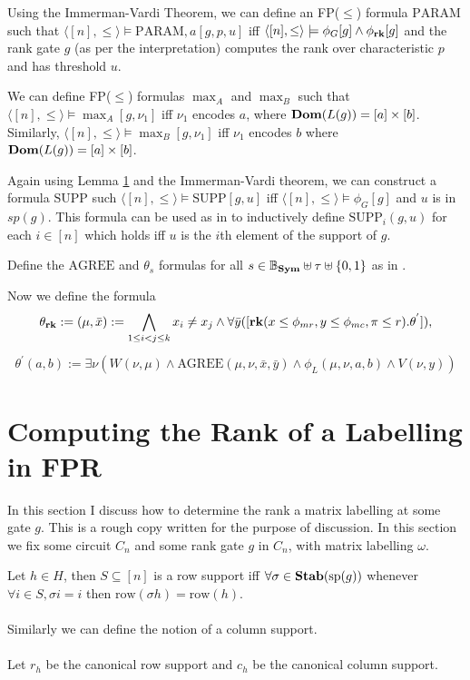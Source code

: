 \documentclass[12pt]{report}
\newcommand{\SB}{\mathbb{B}_{\sym}} %
\newcommand{\stab}{\text{\textbf{Stab}}}
\newcommand{\sym}{\text{\textbf{Sym}}}
\newcommand{\rank}{\text{\textbf{rk}}}
\newcommand{\dom}{\text{\textbf{Dom}}}
\newcommand{\agree}{\text{AGREE}}
\newcommand{\supp}{\text{SUPP}}
\newcommand{\rankparam}{\text{PARAM}}
\newcommand{\consp}{\text{sp}}
\newcommand{\row}{\text{row}}
\begin{document}
Using the Immerman-Vardi Theorem, we can define an FP($\leq$) formula
$\rankparam$ such that $\langle [n], \leq\rangle \models \rankparam,a[g,p,u]$ iff
$\langle [n], \leq\rangle \models \phi_G[g] \land \phi_{\rank}[g]$ and the rank
gate $g$ (as per the interpretation) computes the rank over characteristic $p$
and has threshold $u$.

We can define FP($\leq$) formulas $\max_A$ and $\max_B$ such that $\langle [n],
\leq \rangle \models \max_A[g, \nu_1]$ iff $\nu_1$ encodes $a$, where
$\dom(L(g)) = [a]\times [b]$. Similarly, $\langle [n], \leq \rangle \models
\max_B[g, \nu_1]$ iff $\nu_1$ encodes $b$ where $\dom(L(g)) = [a] \times [b]$.

Again using Lemma \ref{} and the Immerman-Vardi theorem, we can construct a
formula $\supp$ such $\langle [n], \leq \rangle \models \supp[g,u]$ iff $\langle
[n], \leq \rangle \models \phi_G[g]$ and $u$ is in $sp(g)$. This formula can be
used as in \cite{} to inductively define $\supp_i(g,u)$ for each $i \in [n]$
which holds iff $u$ is the $i$th element of the support of $g$.

Define the $\agree$ and $\theta_s$ formulas for all $s \in \SB \uplus \tau
\uplus \{0,1\}$ as in \cite{}.

Now we define the formula
\begin{align*}
  \theta_{\rank}:= (\mu, \bar{x}) := \bigwedge_{1 \leq i < j \leq k} x_i
  \neq x_j \wedge \forall \bar{y} ( [ \rank (x \leq \phi_{mr}, y \leq
  \phi_{mc}, \pi \leq r). \theta^{'} ] ),
\end{align*}
\begin{align*}
  \theta^{'}(a,b):= \exists \nu (W(\nu, \mu) \wedge \agree (\mu,\nu, \bar{x}, \bar{y}) \wedge \phi_L (\mu, \nu, a, b) \wedge V(\nu, y))
\end{align*}

\pagebreak

\section{Computing the Rank of a Labelling in FPR}

In this section I discuss how to determine the rank a matrix labelling at some
gate $g$. This is a rough copy written for the purpose of discussion. In this
section we fix some circuit $C_n$ and some rank gate $g$ in $C_n$, with matrix
labelling $\omega$.

\begin{definition}
  Let $h \in H$, then $S \subseteq [n]$ is a row support iff $\forall \sigma \in
  \stab (\consp(g))$ whenever $\forall i \in S, \sigma i = i$ then $\row (\sigma
  h) = \row (h)$.
  \\~\\
  Similarly we can define the notion of a column support.
  \\~\\
  Let $r_h$ be the canonical row support and $c_h$ be the canonical column
  support.
\end{definition}
\end{document}
